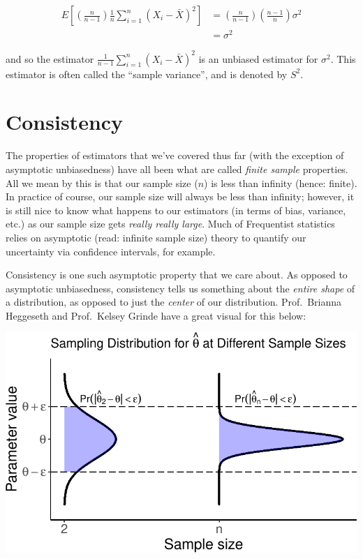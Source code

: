 \documentclass[
  letterpaper,
  DIV=11,
  numbers=noendperiod]{scrreprt}
\begin{document}
\begin{align*}
    E\left[ \left( \frac{n}{n-1} \right)\frac{1}{n} \sum_{i = 1}^n (X_i - \bar{X})^2\right] & = \left( \frac{n}{n-1} \right) \left( \frac{n-1}{n} \right) \sigma^2   \\
    & = \sigma^2
\end{align*}

and so the estimator \(\frac{1}{n-1} \sum_{i = 1}^n (X_i - \bar{X})^2\)
is an unbiased estimator for \(\sigma^2\). This estimator is often
called the ``sample variance'', and is denoted by \(S^2\).


\hypertarget{consistency}{%
\chapter{Consistency}\label{consistency}}

The properties of estimators that we've covered thus far (with the
exception of asymptotic unbiasedness) have all been what are called
\emph{finite sample} properties. All we mean by this is that our sample
size (\(n\)) is less than infinity (hence: finite). In practice of
course, our sample size will always be less than infinity; however, it
is still nice to know what happens to our estimators (in terms of bias,
variance, etc.) as our sample size gets \emph{really really large}. Much
of Frequentist statistics relies on asymptotic (read: infinite sample
size) theory to quantify our uncertainty via confidence intervals, for
example.

Consistency is one such asymptotic property that we care about. As
opposed to asymptotic unbiasedness, consistency tells us something about
the \emph{entire shape} of a distribution, as opposed to just the
\emph{center} of our distribution. Prof.~Brianna Heggeseth and
Prof.~Kelsey Grinde have a great visual for this below:

\includegraphics{consistency_files/figure-pdf/unnamed-chunk-1-1.pdf}
\end{document}

